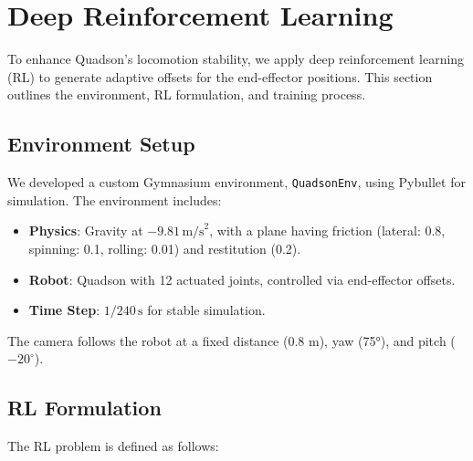 \documentclass[a4paper,11pt]{article}
\begin{document}
\section*{Deep Reinforcement Learning}

To enhance Quadson’s locomotion stability, we apply deep reinforcement learning (RL) to generate adaptive offsets for the end-effector positions. This section outlines the environment, RL formulation, and training process.

\subsection*{Environment Setup}

We developed a custom Gymnasium environment, \texttt{QuadsonEnv}, using Pybullet for simulation. The environment includes:
\begin{itemize}
    \item \textbf{Physics}: Gravity at \(-9.81 \, \text{m/s}^2\), with a plane having friction (lateral: 0.8, spinning: 0.1, rolling: 0.01) and restitution (0.2).
    \item \textbf{Robot}: Quadson with 12 actuated joints, controlled via end-effector offsets.
    \item \textbf{Time Step}: \(1/240 \, \text{s}\) for stable simulation.
\end{itemize}
The camera follows the robot at a fixed distance (0.8 m), yaw (75°), and pitch (\(-20^\circ\)).

\subsection*{RL Formulation}

The RL problem is defined as follows:
\end{document}
